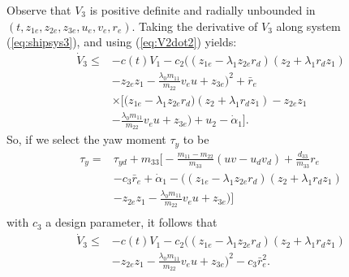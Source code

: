 \documentclass[amsthm, twocolumn]{autart}
\begin{document}
%
%
Observe that $V_3$ is positive definite and radially unbounded in $(t,z_{1e},z_{2e},z_{3e},u_e,v_e,r_e)$. Taking the derivative of $V_3$ along system (\ref{eq:shipsys3}), and using ({\ref{eq:V2dot2}) yields:
%
%
\begin{equation}
\begin{split}
\dot{V}_3 \le & -c(t) V_1 - c_2 \bigg((z_{1e} - \lambda_1 z_{2e} r_d)(z_2 + \lambda_1 r_d z_1) \\
& - z_{2e} z_1 -\frac{\lambda_0 m_{11}}{m_{22}} v_e u + z_{3e} \bigg)^2 + \bar{r}_e \\
& \times \bigg[ \bigg( z_{1e} - \lambda_1 z_{2e} r_d)(z_2 + \lambda_1 r_d z_1) - z_{2e} z_1 \\
& - \frac{\lambda_0 m_{11}}{m_{22}} v_e u + z_{3e} \bigg) + u_2 - \dot{\alpha}_1 \bigg].
\end{split}
\end{equation}
%
%
So, if we select the yaw moment $\tau_y$ to be
%
\begin{equation}
\begin{split}
\tau_y = & \tau_{yd} + m_{33} \bigg[ -\frac{m_{11}-m_{22}}{m_{33}}(uv- u_d v_d) + \frac{d_{33}}{m_{33}} r_e \\
&  -c_3 \bar{r}_e + \dot{\alpha}_1 - ((z_{1e} - \lambda_1 z_{2e} r_d) (z_2 + \lambda_1 r_d z_1)\\
&  -z_{2e} z_1 - \frac{\lambda_0 m_{11}}{m_{22}} v_e u + z_{3e} \bigg) \bigg]\\
\end{split}
\label{eq:pass_tau_y}
\end{equation}
%
%
with $c_3$ a design parameter, it follows that
%
%
\begin{equation}
\begin{split}
\dot{V}_3 \le & -c(t) V_1 - c_2 \bigg((z_{1e} - \lambda_1 z_{2e} r_d)(z_2 + \lambda_1 r_d z_1) \\
& - z_{2e} z_1 -\frac{\lambda_0 m_{11}}{m_{22}} v_e u + z_{3e} \bigg)^2 - c_3 \bar{r}_e^2.
\end{split}
\end{equation}
%
}
\end{document}
